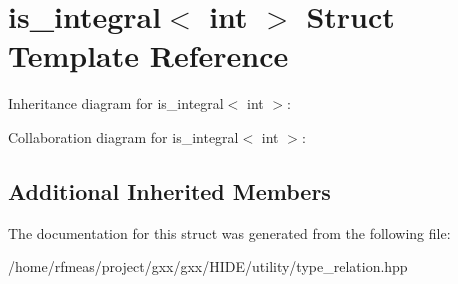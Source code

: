 \hypertarget{structis__integral_3_01int_01_4}{}\section{is\+\_\+integral$<$ int $>$ Struct Template Reference}
\label{structis__integral_3_01int_01_4}


Inheritance diagram for is\+\_\+integral$<$ int $>$\+:


Collaboration diagram for is\+\_\+integral$<$ int $>$\+:
\subsection*{Additional Inherited Members}


The documentation for this struct was generated from the following file\+:\begin{DoxyCompactItemize}
\item 
/home/rfmeas/project/gxx/gxx/\+H\+I\+D\+E/utility/type\+\_\+relation.\+hpp\end{DoxyCompactItemize}
